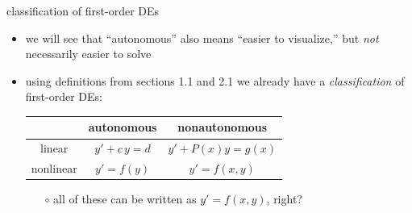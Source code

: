 \documentclass[colorlinks]{beamer}
\begin{document}
\begin{frame}{classification of first-order DEs}

\begin{itemize}
\item we will see that ``autonomous'' also means ``easier to visualize,'' but \emph{not} necessarily easier to solve
\item using definitions from sections 1.1 and 2.1 we already have a \emph{classification} of first-order DEs:

\bigskip
\begin{center}
\begin{tabular}{c|c|c}
 & autonomous & nonautonomous \\ \hline
linear \Large\strut & $y' + c\, y = d$ & $y' + P(x) y = g(x)$ \\ \hline
nonlinear \Large\strut & $y' = f(y)$ & $y'=f(x,y)$
\end{tabular}
\end{center}

\bigskip
    \begin{itemize}
    \item[$\circ$] all of these can be written as $y'=f(x,y)$, right?
    \end{itemize}
\end{itemize}
\end{frame}
\end{document}
